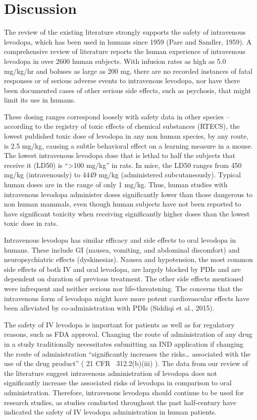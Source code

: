 \section{Discussion}
The review of the existing literature strongly supports the safety of intravenous levodopa, which has been used in humans since 1959 (Pare and Sandler, 1959).  A comprehensive review of literature reports the human experience of intravenous levodopa in over 2600 human subjects.  With infusion rates as high as 5.0 mg/kg/hr and boluses as large as 200 mg, there are no recorded instances of fatal responses or of serious adverse events to intravenous levodopa, nor have there been documented cases of other serious side effects, such as psychosis, that might limit its use in humans.  

These dosing ranges correspond loosely with safety data in other species – according to the registry of toxic effects of chemical substances (RTECS), the lowest published toxic dose of levodopa in any non human species, by any route, is 2.5 mg/kg, causing a subtle behavioral effect on a learning measure in a mouse.  The lowest intravenous levodopa dose that is lethal to half the subjects that receive it (LD50) is “>100 mg/kg” in rats.  In mice, the LD50 ranges from 450 mg/kg (intravenously) to 4449 mg/kg (administered subcutaneously).  Typical human doses are in the range of only 1 mg/kg.  Thus, human studies with intravenous levodopa administer doses significantly lower than those dangerous to non human mammals, even though human subjects have not been reported to have significant toxicity when receiving significantly higher doses than the lowest toxic dose in rats.

Intravenous levodopa has similar efficacy and side effects to oral levodopa in humans.  These include GI (nausea, vomiting, and abdominal discomfort) and neuropsychiatric effects (dyskinesias).  Nausea and hypotension, the most common side effects of both IV and oral levodopa, are largely blocked by PDIs and are dependent on duration of previous treatment.  The other side effects mentioned were infrequent and neither serious nor life-threatening. The concerns that the intravenous form of levodopa might have more potent cardiovascular effects have been alleviated by co-administration with PDIs (Siddiqi et al., 2015).

The safety of IV levodopa is important for patients as well as for regulatory reasons, such as FDA approval.  Changing the route of administration of any drug in a study traditionally necessitates submitting an IND application if changing the route of administration “significantly increases the risks… associated with the use of the drug product” ( 21 CFR 312.2(b)(iii) ).  The data from our review of the literature suggest intravenous administration of levodopa does not significantly increase the associated risks of levodopa in comparison to oral administration.  Therefore, intravenous levodopa should continue to be used for research studies, as studies conducted throughout the past half-century have indicated the safety of IV levodopa administration in human patients.